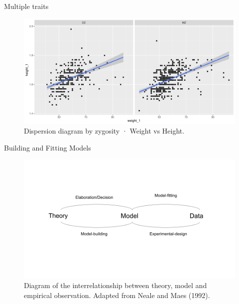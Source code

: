 \documentclass[
  ignorenonframetext,
  serif,
  professionalfont,
  usenames,
  dvipsnames,
  aspectratio = 169]{beamer}
\begin{document}
\begin{frame}{Multiple traits}
\protect\hypertarget{multiple-traits}{}
\begin{figure}

{\centering \includegraphics[width=0.8\linewidth]{Slides_files/figure-beamer/unnamed-chunk-6-1} 

}

\caption{Dispersion diagram by zygosity · Weight vs Height.}\label{fig:unnamed-chunk-6}
\end{figure}
\end{frame}

\begin{frame}{Building and Fitting Models}
\protect\hypertarget{building-and-fitting-models}{}
\begin{figure}

{\centering \includegraphics[width=0.75\linewidth]{./img/model} 

}

\caption{Diagram of the interrelationship between theory, model and empirical observation. Adapted from Neale and Maes (1992).}\label{fig:unnamed-chunk-7}
\end{figure}
\end{frame}
\end{document}
